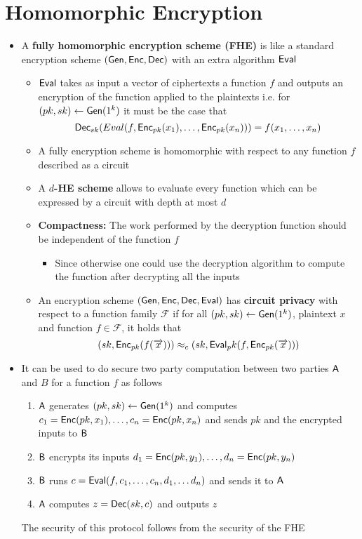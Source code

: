 \section{Homomorphic Encryption}
\begin{itemize}
    \item A \textbf{fully homomorphic encryption scheme (FHE)}  is like a standard encryption scheme $(\mathsf{Gen}, \mathsf{Enc}, \mathsf{Dec})$ with an extra algorithm $\mathsf{Eval}$
    \begin{itemize}
        \item $\mathsf{Eval}$ takes as input a vector of ciphertexts a function $f$ and outputs an encryption of the function applied to the plaintexts i.e. for $(pk, sk) \leftarrow \mathsf{Gen}(1^k)$ it must be the case that
        \begin{equation*}
            \mathsf{Dec}_{sk}(Eval(f, \mathsf{Enc}_{pk}(x_1), \dots, \mathsf{Enc}_{pk}(x_n))) = f(x_1, \dots, x_n)
        \end{equation*}
        \item A fully encryption scheme is homomorphic with respect to any function $f$ described as a circuit
        \item A \textbf{$d$-HE scheme} allows to evaluate every function which can be expressed by a circuit with depth at most $d$ 
        \item \textbf{Compactness:} The work performed by the decryption function should be independent of the function $f$
        \begin{itemize}
            \item Since otherwise one could use the decryption algorithm to compute the function after decrypting all the inputs
        \end{itemize}
        \item An encryption scheme $(\mathsf{Gen}, \mathsf{Enc}, \mathsf{Dec}, \mathsf{Eval})$ has \textbf{circuit privacy} with respect to a function family $\mathcal{F}$ if for all $(pk, sk) \leftarrow \mathsf{Gen}(1^k)$, plaintext $x$ and function $f \in \mathcal F$, it holds that
        \begin{equation*}
            (sk, \mathsf{Enc}_{pk}(f(\overrightarrow x))) \approx_c (sk, \mathsf{Eval}_pk(f, \mathsf{Enc}_{pk}(\overrightarrow x)))
        \end{equation*}
    \end{itemize}
    \item It can be used to do secure two party computation between two parties $\mathsf{A}$ and $B$ for a function $f$ as follows
    \begin{enumerate}
        \item $\mathsf{A}$ generates $(pk, sk) \leftarrow \mathsf{Gen}(1^k)$ and computes $c_1 = \mathsf{Enc}(pk, x_1), \dots, c_n = \mathsf{Enc}(pk, x_n)$ and sends $pk$ and the encrypted inputs to $\mathsf{B}$
        \item $\mathsf{B}$ encrypts its inputs $d_1 = \mathsf{Enc}(pk, y_1), \dots, d_n = \mathsf{Enc}(pk , y_n)$
        \item $\mathsf{B}$ runs $c =\mathsf{Eval}(f, c_1, \dots, c_n, d_1, \dots d_n)$ and sends it to $\mathsf{A}$
        \item $\mathsf{A}$ computes $z = \mathsf{Dec}(sk, c)$ and outputs $z$ 
    \end{enumerate}
    The security of this protocol follows from the security of the FHE
\end{itemize}

